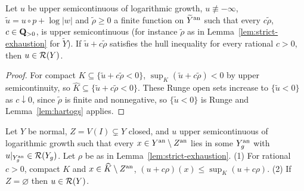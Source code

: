 \begin{lemma}\label{lem:hull-criterion}
\leanok
{}
Let $u$ be upper semicontinuous of logarithmic growth, $u\not\equiv-\infty$,
$\widetilde u=u\circ p+\log|w|$ and $\widetilde\rho\ge0$ a finite function on $\widetilde Y^{\mathrm{an}}$ such that
every $c\widetilde\rho$, $c\in\mathbf{Q}_{>0}$, is upper semicontinuous (for instance $\widetilde\rho$ as in
Lemma~\ref{lem:strict-exhaustion} for $\widetilde Y$). If $\widetilde u+c\widetilde\rho$ satisfies the hull inequality for every rational
$c>0$, then $u\in\mathcal{R}(Y)$.
\end{lemma}

\begin{proof}
For compact $K\subseteq\{\widetilde u+c\widetilde\rho<0\}$, $\sup_K(\widetilde u+c\widetilde\rho)<0$ by
upper semicontinuity, so $\widehat K\subseteq\{\widetilde u+c\widetilde\rho<0\}$. These Runge open sets
increase to $\{\widetilde u<0\}$ as $c\downarrow0$, since $\widetilde\rho$ is finite and nonnegative,
so $\{\widetilde u<0\}$ is Runge and Lemma~\ref{lem:hartogs} applies.
\end{proof}

\begin{proposition}\label{prop:gluing}
\leanok
{}
Let $Y$ be normal, $Z=V(I)\subsetneq Y$ closed, and $u$ upper semicontinuous of logarithmic growth
such that every $x\in Y^{\mathrm{an}}\setminus Z^{\mathrm{an}}$ lies in some $Y_g^{\mathrm{an}}$ with $u|_{Y_g^{\mathrm{an}}}\in\mathcal{R}(Y_g)$.
Let $\rho$ be as in Lemma~\ref{lem:strict-exhaustion}. (1) For rational $c>0$, compact $K$ and
$x\in\widehat K\setminus Z^{\mathrm{an}}$, $(u+c\rho)(x)\le\sup_K(u+c\rho)$. (2) If $Z=\varnothing$ then
$u\in\mathcal{R}(Y)$.
\end{proposition}

